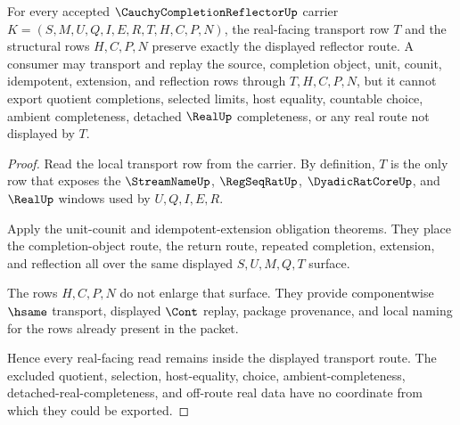 \begin{theorem}
\label{thm:cauchy-completion-reflector-real-transport-nonescape}
For every accepted $\CauchyCompletionReflectorUp$ carrier $K=(S,M,U,Q,I,E,R,T,H,C,P,N)$, the real-facing transport row $T$ and the structural rows $H,C,P,N$ preserve exactly the displayed reflector route. A consumer may transport and replay the source, completion object, unit, counit, idempotent, extension, and reflection rows through $T,H,C,P,N$, but it cannot export quotient completions, selected limits, host equality, countable choice, ambient completeness, detached $\RealUp$ completeness, or any real route not displayed by $T$.
\end{theorem}
\begin{proof}
Read the local transport row from the carrier. By definition, $T$ is the only row that exposes the $\StreamNameUp$, $\RegSeqRatUp$, $\DyadicRatCoreUp$, and $\RealUp$ windows used by $U,Q,I,E,R$.

Apply the unit-counit and idempotent-extension obligation theorems. They place the completion-object route, the return route, repeated completion, extension, and reflection all over the same displayed $S,U,M,Q,T$ surface.

The rows $H,C,P,N$ do not enlarge that surface. They provide componentwise $\hsame$ transport, displayed $\Cont$ replay, package provenance, and local naming for the rows already present in the packet.

Hence every real-facing read remains inside the displayed transport route. The excluded quotient, selection, host-equality, choice, ambient-completeness, detached-real-completeness, and off-route real data have no coordinate from which they could be exported.
\end{proof}

